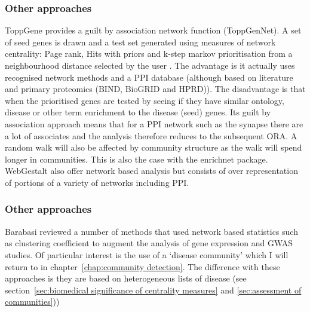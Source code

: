 \subsubsection{Other approaches}



ToppGene  \cite{chen2009toppgene} provides a guilt by association network function (ToppGenNet).  A set of seed genes is drawn and a test set generated using measures of network centrality: Page rank, Hits with priors and k-step markov prioritisation from a neighbourhood distance selected by the user \cite{chen2009disease}. The advantage is it actually uses recognised network methods and a PPI database (although based on literature and primary proteomics (BIND, BioGRID and HPRD)). The disadvantage is that when the prioritised genes are tested by seeing if they have similar ontology, disease or other term enrichment to the disease (seed) genes. Its guilt by association approach means that for a PPI network such as the synapse there are a lot of associates  and the analysis therefore reduces to the subsequent ORA. A random walk will also be affected by  community structure as the walk will spend longer in communities. This is also the case with the enrichnet package\cite{glaab2012enrichnet}.   
WebGestalt \cite{liao2019webgestalt} also offer network based analysis but consists of over representation of portions of a variety of networks including PPI.









\subsubsection{Other approaches}
\label{sec:intro other approaches}
Barabasi \cite{barabasi2011network} reviewed a number of methods that used network based statistics such as clustering coefficient to augment the analysis of gene expression and GWAS studies. Of particular interest is the use of a `disease community' which I will return to in chapter~\ref{chap:community detection}. The difference with these approaches is they are based on heterogeneous lists of disease (see section~\ref{sec:biomedical significance of centrality measures} and \ref{sec:assessment of communities})) 


